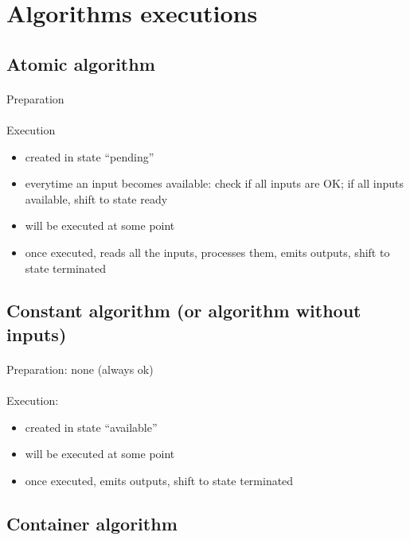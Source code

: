\documentclass[a4paper,10pt]{book}
\begin{document}
\section{Algorithms executions}

\subsection{Atomic algorithm}

\paragraph*{}
Preparation

\paragraph*{}
Execution
\begin{itemize}
\item created in state ``pending''
\item everytime an input becomes available: check if all inputs are OK; if all inputs available, shift to state ready
\item will be executed at some point
\item once executed, reads all the inputs, processes them, emits outputs, shift to state terminated
\end{itemize}


\subsection{Constant algorithm (or algorithm without inputs)}

\paragraph*{}
Preparation: none (always ok)

\paragraph*{}
Execution:
\begin{itemize}
\item created in state ``available''
\item will be executed at some point
\item once executed, emits outputs, shift to state terminated
\end{itemize}


\subsection{Container algorithm}
\end{document}
